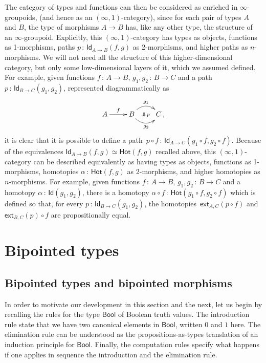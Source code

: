 \documentclass[10pt,a4paper,oneside,reqno]{amsart}
\numberwithin{equation}{section}
\theoremstyle{mythm}
\theoremstyle{mydef}
\theoremstyle{myrmk}
\newcommand{\co}{\,{:}\,}
\newcommand{\Hot}{\mathsf{Hot}}
\newcommand{\ext}{\mathsf{ext}}
\newcommand{\Bool}{\mathsf{Bool}}
\newcommand{\Id}{\mathsf{Id}}
\begin{document}
The category of types and functions can then be considered as enriched in $\infty$-groupoids,
(and hence as an $(\infty, 1)$-category),  since for each pair of types $A$ and $B$, the type of morphisms $A \to B$ has, like any other type, the structure of an $\infty$-groupoid. Explicitly, this $(\infty, 1)$-category has types as objects,
functions as 1-morphisms, paths $p \co \Id_{A \to B}(f, g)$ as 2-morphisms, and higher paths as $n$-morphisms. We will not need all the structure of this higher-dimensional category, but only some low-dimensional layers of it,
which we assumed defined.  For example, given functions $f \co A \to B$, $g_1, g_2 \co B \to C$ and a path $p \co \Id_{B \to C}(g_1, g_2)$, represented diagrammatically as 
\[
\xymatrix{
A \ar[r]^{f} & B \ar@/^1pc/[r]^{g_1} \ar@/_1pc/[r]_{g_2} \ar@{}[r]|{\Downarrow \, p}  & C \, ,}
\]
it is clear that it is possible to define a path~$p \circ f \co \Id_{A \to C} (g_1 \circ f,  g_2 \circ f)$. Because of the equivalences $\Id_{A \to B}(f,g) \simeq \Hot(f,g)$ recalled above, this $(\infty,1)$-category can be described equivalently
as having  types as objects, functions as 1-morphisms, homotopies $\alpha \co \Hot(f, g)$ as 2-morphisms, and higher homotopies as $n$-morphisms. For example, given functions $f \co A \to B$, $g_1, g_2 \co B \to C$ and a homotopy $\alpha \co \Id(g_1, g_2)$, there is a homotopy $\alpha \circ f \co \Hot(g_1 \circ f, g_2 \circ f)$ which is defined so that, for every $p \co \Id_{B \to C}(g_1, g_2)$, the homotopies~$\ext_{A,C}( p \circ f )$ and  $\ext_{B,C}(p) \circ f$ are propositionally equal. 



\section{Bipointed types}
\label{sec:bip}

\subsection{Bipointed types and bipointed morphisms} \label{sec:biptm}
In order to motivate our development in this section and the next, 
let us begin by recalling the rules for the type $\Bool$ of Boolean truth values. The introduction rule state that we have two canonical elements in $\Bool$, written $0$ and $1$ here. The elimination rule can be understood as the propositions-as-types translation of an induction principle for $\Bool$. Finally, the computation rules specify what happens if one applies in sequence the introduction and the elimination rule.
\end{document}
